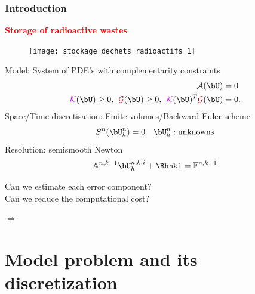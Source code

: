 \documentclass[10 pt]{beamer}
\begin{document}
\begin{frame}
\frametitle{Introduction}
\hspace*{0.2 cm} \textcolor{red}{\textbf{Storage of radioactive wastes}}

\begin{minipage}{0.49 \linewidth}
\begin{figure}
\texttt{[image: stockage\_dechets\_radioactifs\_1]}
\end{figure}
\end{minipage}
\hfill
\begin{minipage}{0.49 \linewidth}
Model: System of PDE's with complementarity constraints
\begin{equation*}
\begin{split}
\mathcal{A}(\bU)& {}= 0\\
\textcolor{electricpurple}{\mathcal{K}}(\bU) \geq 0, \hspace{0.15 cm} \textcolor{carmine}{\mathcal{G}}(\bU) \geq 0, \hspace{0.15 cm} \textcolor{electricpurple}{\mathcal{K}}(\bU)^{T} \textcolor{carmine}{\mathcal{G}}(\bU) &= 0.
\end{split}
\end{equation*}
Space/Time discretisation: Finite volumes/Backward Euler scheme
\begin{equation*}
S^n(\bU_h^n)=0 \quad \bU_h^n: \mbox{unknowns}
\end{equation*}
Resolution: semismooth Newton 
\begin{equation*}
\mathbb{A}^{n,k-1} \bU_h^{n,k,i} + \Rhnki = \mathbb{F}^{n,k-1}
\end{equation*}
\end{minipage}
\begin{minipage}{0.49 \linewidth}

Can we estimate each error component?\\
 Can we reduce the computational cost?
\end{minipage}
\hfill
\begin{minipage}{0.49 \linewidth}
${\bm \Rightarrow}$ 
\end{minipage}
\end{frame}

\section{Model problem and its discretization}
    
\end{document}
